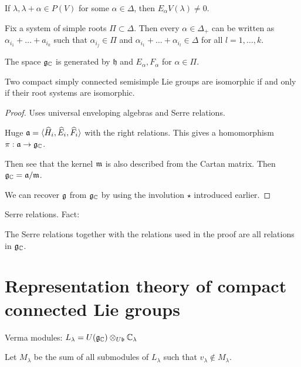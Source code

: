 \documentclass[11pt, english]{article}
\begin{document}
\begin{corr}
  If $\lambda, \lambda+\alpha \in P(V)$ for some $\alpha \in \Delta$, then $E_\alpha V(\lambda) \neq 0$. 
\end{corr}

\begin{prop}
 Fix a system of simple roots $\Pi \subset \Delta$. Then every $\alpha \in \Delta_+$ can be written as $\alpha_{i_1}+\ldots+a_{i_k}$ such that $\alpha_{i_j} \in \Pi$ and $\alpha_{i_1}+\ldots+\alpha_{i_l} \in \Delta$ for all $l=1,\ldots,k$. 
\end{prop}

\begin{corr}
The space  $\mathfrak g_{\mathbb{C}}$ is generated by $\mathfrak h$ and $E_\alpha, F_\alpha$ for $\alpha \in \Pi$.
\end{corr}

\begin{thm}
 Two compact simply connected semisimple Lie groups are isomorphic if and only if their root systems are isomorphic.
\end{thm}
\begin{proof}
  Uses universal enveloping algebras and Serre relations.

Huge $\mathfrak{a} = \langle \widehat H_i , \widehat E_i, \widehat F_i \rangle$ with the right relations. This gives a homomorphism $\pi:\mathfrak{a} \to \mathfrak g_{\mathbb{C}}$.

Then see that the kernel $\mathfrak{m}$ is also described from the Cartan matrix. Then $\mathfrak g_{\mathbb{C}} = \mathfrak{a}/\mathfrak{m}$. 

We can recover $\mathfrak g$ from $\mathfrak g_{\mathbb{C}}$ by using the involution $\star$ introduced earlier.
\end{proof}

Serre relations. Fact:

\begin{prop}
  The Serre relations together with the relations used in the proof are all relations in $\mathfrak g_{\mathbb{C}}$.
\end{prop}


\newpage
\section{Representation theory of compact connected Lie groups}

Verma modules: $L_\lambda = U(\mathfrak g_{\mathbb{C}}) \otimes_{U\mathfrak b} \mathbb{C}_\lambda$


Let $M_\lambda$ be the sum of all submodules of $L_\lambda$ such that $v_\lambda \not \in M_\lambda$. 
\end{document}
